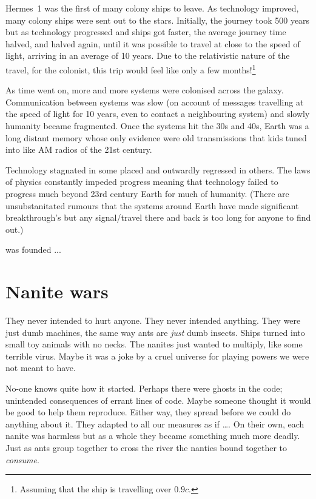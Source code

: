 Hermes~1 was the first of many colony ships to leave. As technology improved,
many colony ships were sent out to the stars. Initially, the journey took 500
years but as technology progressed and ships got faster, the average journey
time halved, and halved again, until it was possible to travel at close to the
speed of light, arriving in an average of 10 years. Due to the relativistic
nature of the travel, for the colonist, this trip would feel like only a few
months!\footnote{Assuming that the ship is travelling over \(0.9c\).}

As time went on, more and more systems were colonised across the galaxy.
Communication between systems was slow (on account of messages travelling at the
speed of light for 10 years, even to contact a neighbouring system) and slowly
humanity became fragmented. Once the systems hit the 30s and 40s, Earth was a
long distant memory whose only evidence were old transmissions that kids tuned
into like AM radios of the 21st century.

Technology stagnated in some placed and outwardly regressed in others. The laws
of physics constantly impeded progress meaning that technology failed to
progress much beyond 23rd century Earth for much of humanity. (There are
unsubstanitated rumours that the systems around Earth have made significant
breakthrough's but any signal/travel there and back is too long for anyone to
find out.)

 was founded ...


\section{Nanite wars}
\label{sec:nanite-wars}

They never intended to hurt anyone. They never intended anything. They were just
dumb machines, the same way ants are \emph{just} dumb insects. Ships turned into
small toy animals with no necks. The nanites just wanted to multiply, like some
terrible virus. Maybe it was a joke by a cruel universe for playing powers we
were not meant to have.

No-one knows quite how it started. Perhaps there were ghosts in the code; unintended
consequences of errant lines of code. Maybe someone thought it would be good to help
them reproduce. Either way, they spread before we could do anything about it. They
adapted to all our measures as if \ldots{}. On their own, each nanite was harmless
but as a whole they became something much more deadly. Just as ants group together
to cross the river the nanties bound together to \emph{consume}.

